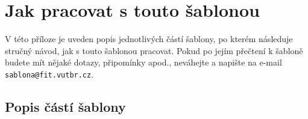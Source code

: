 
%






\chapter{Jak pracovat s touto šablonou}
\label{jak}

V této příloze je uveden popis jednotlivých částí šablony, po kterém následuje stručný návod, jak s touto šablonou pracovat. Pokud po jejím přečtení k šabloně budete mít nějaké dotazy, připomínky apod., neváhejte a napište na e-mail \texttt{sablona@fit.vutbr.cz}.

\section{Popis částí šablony}

